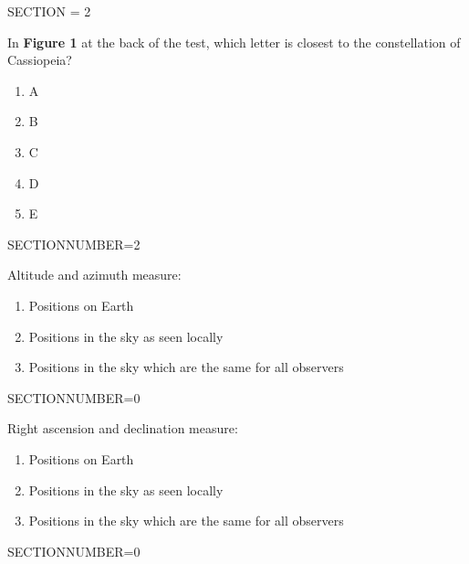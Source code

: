 \documentclass[11pt]{article}
\begin{document}
\begin{enumerate}
\pagebreak 
\begin{minipage}{\textwidth} 
\begin{minipage}{\textwidth} 
\bigskip SECTION = 2
\end{minipage}
\end{minipage}
\begin{minipage}{\textwidth}
\begin{minipage}{\textwidth}
\item In {\bf Figure 1} at the back of the test, which letter is closest to the constellation of  Cassiopeia?
\begin{multicols}{3}
\begin{enumerate} 
\setlength{\itemsep}{1pt} 
\setlength{\parskip}{0pt} 
\setlength{\parsep}{0pt}
\setlength{\multicolsep}{1pt} 
\item A
\item B
\item C
\item D
\item E
\end{enumerate} 
\vfill 
\end{multicols}

\end{minipage}
SECTIONNUMBER=2
\end{minipage}
\vskip 0.20in

\begin{minipage}{\textwidth}
\begin{minipage}{\textwidth}
\item Altitude and azimuth measure:
\begin{enumerate} 
\setlength{\itemsep}{1pt} 
\setlength{\parskip}{0pt} 
\setlength{\parsep}{0pt}
\setlength{\multicolsep}{1pt} 
\item Positions on Earth
\item Positions in the sky as seen locally
\item Positions in the sky which are the same for all observers
\end{enumerate} 
\end{minipage}
SECTIONNUMBER=0
\end{minipage}
\vskip 0.20in

\begin{minipage}{\textwidth}
\begin{minipage}{\textwidth}
\item Right ascension and declination measure:
\begin{enumerate} 
\setlength{\itemsep}{1pt} 
\setlength{\parskip}{0pt} 
\setlength{\parsep}{0pt}
\setlength{\multicolsep}{1pt} 
\item Positions on Earth
\item Positions in the sky as seen locally
\item Positions in the sky which are the same for all observers
\end{enumerate} 
\end{minipage}
SECTIONNUMBER=0
\end{minipage}
\vskip 0.20in


\end{enumerate}
\end{document}
